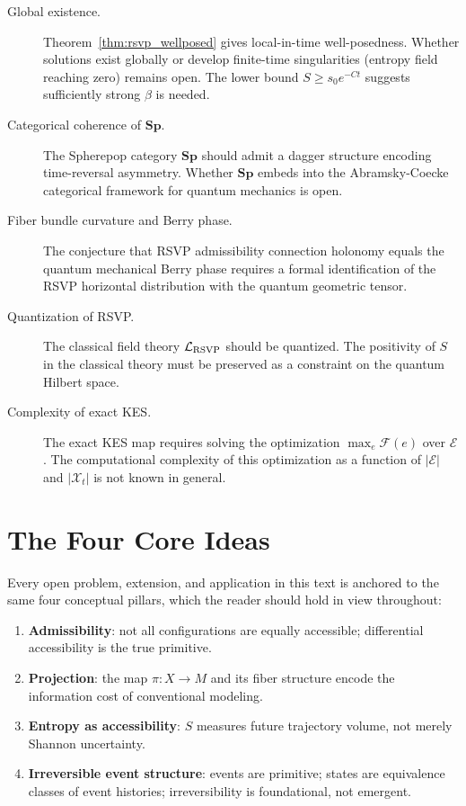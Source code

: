 \documentclass[11pt, openright, twoside]{book}
\theoremstyle{plain}
\theoremstyle{definition}
\theoremstyle{remark}
\newcommand{\Sfield}{S}
\newcommand{\Traj}{X}
\newcommand{\Rep}{M}
\newcommand{\proj}{\pi}
\begin{document}
\begin{description}
\item[Global existence.] Theorem~\ref{thm:rsvp_wellposed} gives local-in-time well-posedness.
  Whether solutions exist globally or develop finite-time singularities (entropy field reaching
  zero) remains open. The lower bound $\Sfield\geq s_0 e^{-Ct}$ suggests sufficiently strong
  $\beta$ is needed.

\item[Categorical coherence of $\mathbf{Sp}$.] The Spherepop category $\mathbf{Sp}$ should
  admit a dagger structure encoding time-reversal asymmetry. Whether $\mathbf{Sp}$ embeds
  into the Abramsky-Coecke categorical framework for quantum mechanics is open.

\item[Fiber bundle curvature and Berry phase.] The conjecture that RSVP admissibility
  connection holonomy equals the quantum mechanical Berry phase requires a formal identification
  of the RSVP horizontal distribution with the quantum geometric tensor.

\item[Quantization of RSVP.] The classical field theory $\mathcal{L}_{\rm RSVP}$ should be
  quantized. The positivity of $\Sfield$ in the classical theory must be preserved as a
  constraint on the quantum Hilbert space.

\item[Complexity of exact KES.] The exact KES map requires solving the optimization
  $\max_e\mathcal{F}(e)$ over $\mathcal{E}$. The computational complexity of this
  optimization as a function of $|\mathcal{E}|$ and $|\mathcal{X}_t|$ is not known in general.
\end{description}

\section{The Four Core Ideas}

Every open problem, extension, and application in this text is anchored to the same four
conceptual pillars, which the reader should hold in view throughout:

\begin{enumerate}
\item \textbf{Admissibility}: not all configurations are equally accessible; differential
  accessibility is the true primitive.

\item \textbf{Projection}: the map $\proj:\Traj\to\Rep$ and its fiber structure encode
  the information cost of conventional modeling.

\item \textbf{Entropy as accessibility}: $\Sfield$ measures future trajectory volume,
  not merely Shannon uncertainty.

\item \textbf{Irreversible event structure}: events are primitive; states are equivalence
  classes of event histories; irreversibility is foundational, not emergent.
\end{enumerate}
\end{document}
